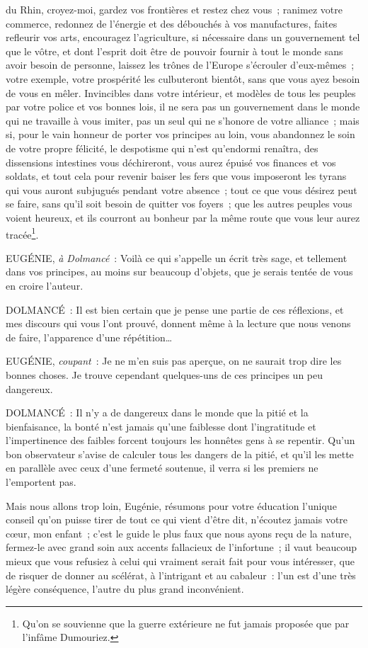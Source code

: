 \documentclass[french,twoside]{book} %
\begin{document}
du Rhin, croyez-moi, gardez vos frontières et restez chez vous ; ranimez votre commerce, redonnez de l’énergie et des débouchés à vos manufactures, faites refleurir vos arts, encouragez l’agriculture, si nécessaire dans un gouvernement tel que le vôtre, et dont l’esprit doit être de pouvoir fournir à tout le monde sans avoir besoin de personne, laissez les trônes de l’Europe s’écrouler d’eux-mêmes ; votre exemple, votre prospérité les culbuteront bientôt, sans que vous ayez besoin de vous en mêler. Invincibles dans votre intérieur, et modèles de tous les peuples par votre police et vos bonnes lois, il ne sera pas un gouvernement dans le monde qui ne travaille à vous imiter, pas un seul qui ne s’honore de votre alliance ; mais si, pour le vain honneur de porter vos principes au loin, vous abandonnez le soin de votre propre félicité, le despotisme qui n’est qu’endormi renaîtra, des dissensions intestines vous déchireront, vous aurez épuisé vos finances et vos soldats, et tout cela pour revenir baiser les fers que vous imposeront les tyrans qui vous auront subjugués pendant votre absence ; tout ce que vous désirez peut se faire, sans qu’il soit besoin de quitter vos foyers ; que les autres peuples vous voient heureux, et ils courront au bonheur par la même route que vous leur aurez tracée\footnote{ Qu’on se souvienne que la guerre extérieure ne fut jamais proposée que par l’infâme Dumouriez.}.\par
EUGÉNIE, {\itshape à Dolmancé} : Voilà ce qui s’appelle un écrit très sage, et tellement dans vos principes, au moins sur beaucoup d’objets, que je serais tentée de vous en croire l’auteur.\par
DOLMANCÉ : Il est bien certain que je pense une partie de ces réflexions, et mes discours qui vous l’ont prouvé, donnent même à la lecture que nous venons de faire, l’apparence d’une répétition…\par
EUGÉNIE, {\itshape coupant} : Je ne m’en suis pas aperçue, on ne saurait trop dire les bonnes choses. Je trouve cependant quelques-uns de ces principes un peu dangereux.\par
DOLMANCÉ : Il n’y a de dangereux dans le monde que la pitié et la bienfaisance, la bonté n’est jamais qu’une faiblesse dont l’ingratitude et l’impertinence des faibles forcent toujours les honnêtes gens à se repentir. Qu’un bon observateur s’avise de calculer tous les dangers de la pitié, et qu’il les mette en parallèle avec ceux d’une fermeté soutenue, il verra si les premiers ne l’emportent pas.\par
Mais nous allons trop loin, Eugénie, résumons pour votre éducation l’unique conseil qu’on puisse tirer de tout ce qui vient d’être dit, n’écoutez jamais votre cœur, mon enfant ; c’est le guide le plus faux que nous ayons reçu de la nature, fermez-le avec grand soin aux accents fallacieux de l’infortune ; il vaut beaucoup mieux que vous refusiez à celui qui vraiment serait fait pour vous intéresser, que de risquer de donner au scélérat, à l’intrigant et au cabaleur : l’un est d’une très légère conséquence, l’autre du plus grand inconvénient.\par
\end{document}
